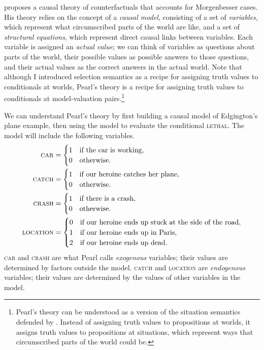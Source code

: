  \citet{pearl-causality} proposes a causal theory of counterfactuals that accounts for Morgenbesser cases.  His theory relies on the concept of a \emph{causal model}, consisting of a set of \emph{variables}, which represent what circumscribed parts of the world are like, and a set of \emph{structural equations}, which represent direct causal links between variables.  Each variable is assigned an \emph{actual value}; we can think of variables as questions about parts of the world, their possible values as possible answers to those questions, and their actual values as the correct answers in the actual world.  Note that although I introduced selection semantics as a recipe for assigning truth values to conditionals at worlds, Pearl's theory is a recipe for assigning truth values to conditionals at model-valuation pairs.\footnote{Pearl's theory can be understood as a version of the situation semantics defended by \citet{Barwise1981-BARSAA-2}.  Instead of assigning truth values to propositions at worlds, it assigns truth values to propositions at situations, which represent ways that circumscribed parts of the world could be.}

We can understand Pearl's theory by first building a causal model of Edgington's plane example, then using the model to evaluate the conditional \textsc{lethal}. The model will include the following variables.
$$
\begin{aligned}
\text{\textsc{car}} &= 
  \begin{cases}
	1 & \text{if the car is working},\\
	0 & \text{otherwise}.
  \end{cases}\\
\text{\textsc{catch}} &=
  \begin{cases}
	1 & \text{if our heroine catches her plane},\\
	0 & \text{otherwise}.
  \end{cases}\\
\text{\textsc{crash}} &= 
  \begin{cases}
	1 & \text{if there is a crash},\\
	0 & \text{otherwise}.
  \end{cases}\\
\text{\textsc{location}} &= 
  \begin{cases}
	0 & \text{if our heroine ends up stuck at the side of the road},\\
	1 & \text{if our heroine ends up in Paris},\\
	2 & \text{if our heroine ends up dead}.
  \end{cases}
\end{aligned}
$$
\textsc{car} and \textsc{crash} are what Pearl calls \emph{exogenous} variables; their values are determined by factors outside the model.  \textsc{catch} and \textsc{location} are \emph{endogenous} variables; their values are determined by the values of other variables in the model.

